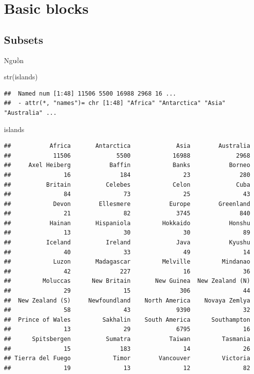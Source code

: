 \documentclass[
]{book}
\newenvironment{Shaded}{\begin{snugshade}}{\end{snugshade}}
\newcommand{\FunctionTok}[1]{\textcolor[rgb]{0.00,0.00,0.00}{#1}}
\newcommand{\NormalTok}[1]{#1}
\theoremstyle{definition}
\theoremstyle{definition}
\theoremstyle{definition}
\theoremstyle{definition}
\theoremstyle{remark}
\begin{document}
\hypertarget{basic-blocks}{%
\chapter{Basic blocks}\label{basic-blocks}}

\hypertarget{subsets}{%
\section{Subsets}\label{subsets}}

Nguồn \citep[p.~241]{devriesDummies2015}

\begin{Shaded}
\begin{Highlighting}[]
\FunctionTok{str}\NormalTok{(islands)}
\end{Highlighting}
\end{Shaded}

\begin{verbatim}
##  Named num [1:48] 11506 5500 16988 2968 16 ...
##  - attr(*, "names")= chr [1:48] "Africa" "Antarctica" "Asia" "Australia" ...
\end{verbatim}

\begin{Shaded}
\begin{Highlighting}[]
\NormalTok{islands}
\end{Highlighting}
\end{Shaded}

\begin{verbatim}
##           Africa       Antarctica             Asia        Australia 
##            11506             5500            16988             2968 
##     Axel Heiberg           Baffin            Banks           Borneo 
##               16              184               23              280 
##          Britain          Celebes            Celon             Cuba 
##               84               73               25               43 
##            Devon        Ellesmere           Europe        Greenland 
##               21               82             3745              840 
##           Hainan       Hispaniola         Hokkaido           Honshu 
##               13               30               30               89 
##          Iceland          Ireland             Java           Kyushu 
##               40               33               49               14 
##            Luzon       Madagascar         Melville         Mindanao 
##               42              227               16               36 
##         Moluccas      New Britain       New Guinea  New Zealand (N) 
##               29               15              306               44 
##  New Zealand (S)     Newfoundland    North America    Novaya Zemlya 
##               58               43             9390               32 
##  Prince of Wales         Sakhalin    South America      Southampton 
##               13               29             6795               16 
##      Spitsbergen          Sumatra           Taiwan         Tasmania 
##               15              183               14               26 
## Tierra del Fuego            Timor        Vancouver         Victoria 
##               19               13               12               82
\end{verbatim}
\end{document}
